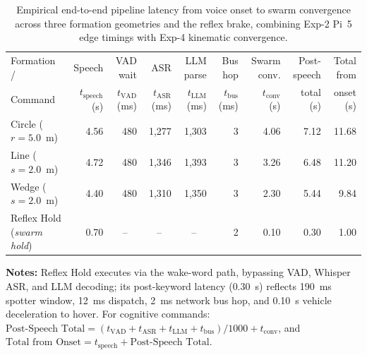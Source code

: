 \begin{table}[htbp]
  \centering
  \scriptsize
  \setlength{\tabcolsep}{2.5pt}
  \caption[End-to-end command-to-formation pipeline latency across formations]{Empirical end-to-end pipeline latency from voice onset to swarm convergence across three formation geometries and the reflex brake, combining Exp-2 Pi~5 edge timings with Exp-4 kinematic convergence.}
  \label{tab:formation-latency}
  \begin{tabular}{lrrrrrrrr}
    \toprule
    Formation / & Speech & VAD wait & ASR & LLM parse & Bus hop & Swarm conv. & Post-speech & Total from \\
    Command & $t_\text{speech}$ (s) & $t_\text{VAD}$ (ms) & $t_\text{ASR}$ (ms) & $t_\text{LLM}$ (ms) & $t_\text{bus}$ (ms) & $t_\text{conv}$ (s) & total (s) & onset (s) \\
    \midrule
    Circle ($r = 5.0$~m) & 4.56 & 480 & 1,277 & 1,303 & 3 & 4.06 & 7.12 & 11.68 \\
    Line ($s = 2.0$~m) & 4.72 & 480 & 1,346 & 1,393 & 3 & 3.26 & 6.48 & 11.20 \\
    Wedge ($s = 2.0$~m) & 4.40 & 480 & 1,310 & 1,350 & 3 & 2.30 & 5.44 & 9.84 \\
    Reflex Hold (\emph{swarm hold}) & 0.70 & \multicolumn{1}{c}{--} & \multicolumn{1}{c}{--} & \multicolumn{1}{c}{--} & 2 & 0.10 & 0.30 & 1.00 \\
    \bottomrule
  \end{tabular}
  \par\medskip
  \begin{minipage}{\textwidth}\scriptsize\raggedright
    \textbf{Notes:} Reflex Hold executes via the wake-word path, bypassing VAD, Whisper ASR, and LLM decoding; its post-keyword latency ($0.30$~s) reflects 190~ms spotter window, 12~ms dispatch, 2~ms network bus hop, and 0.10~s vehicle deceleration to hover. For cognitive commands: $\text{Post-Speech Total} = (t_\text{VAD} + t_\text{ASR} + t_\text{LLM} + t_\text{bus}) / 1000 + t_\text{conv}$, and $\text{Total from Onset} = t_\text{speech} + \text{Post-Speech Total}$.
  \end{minipage}
\end{table}
